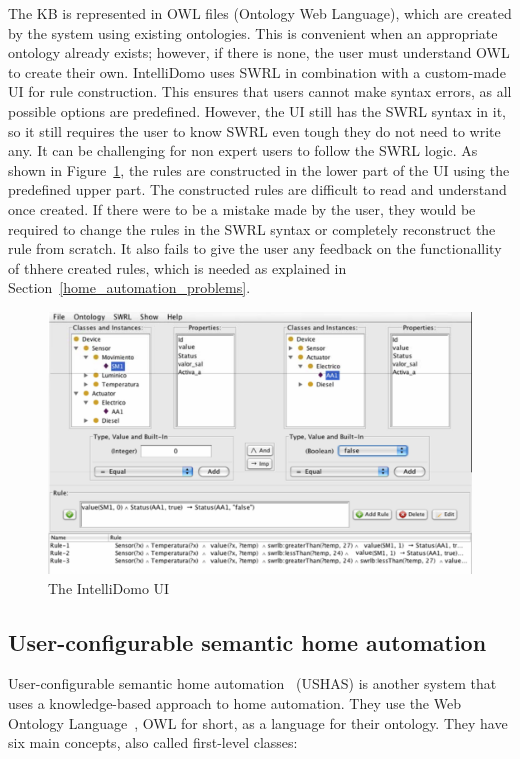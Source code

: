 \documentclass[11pt,a4paper]{report}
\begin{document}
The KB is represented in OWL files (Ontology Web Language), which are created by the system using existing ontologies. This is convenient when an appropriate ontology already exists; however, if there is none, the user must understand OWL to create their own. IntelliDomo uses SWRL in combination with a custom-made UI for rule construction. This ensures that users cannot make syntax errors, as all possible options are predefined. However, the UI still has the SWRL syntax in it, so it still requires the user to know SWRL even tough they do not need to write any. It can be challenging for non expert users to follow the SWRL logic. As shown in Figure~\ref{fig:IntelliDomo_UI}, the rules are constructed in the lower part of the UI using the predefined upper part. The constructed rules are difficult to read and understand once created. If there were to be a mistake made by the user, they would be required to change the rules in the SWRL syntax or completely reconstruct the rule from scratch. It also fails to give the user any feedback on the functionallity of thhere created rules, which is needed as explained in Section~\ref{home_automation_problems}. 

\begin{figure}
    \centering
    \includegraphics[width=0.8\linewidth]{images/IntelliDomo_UI.png}
    \caption{The IntelliDomo UI~\cite{SOTA_OntologyBased}}
    \label{fig:IntelliDomo_UI}
\end{figure}

\subsection{User-configurable semantic home automation}
\label{USHAS}
User-configurable semantic home automation~\cite{SOTA_AutomationConfigurationSmarthome} (USHAS) is another system that uses a knowledge-based approach to home automation. They use the Web Ontology Language~\cite{OWL}, OWL for short, as a language for their ontology. They have six main concepts, also called first-level classes:
\end{document}
